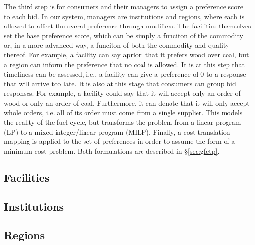 The third step is for consumers and their managers to assign a preference score
to each bid. In our system, managers are institutions and regions, where each is
allowed to affect the overal preference through modifiers. The facilities
themselves set the base preference score, which can be simply a funciton of the
commodity or, in a more advanced way, a funciton of both the commodity and
quality thereof. For example, a facility can say apriori that it prefers wood
over coal, but a region can inform the preference that no coal is allowed. It is
at this step that timeliness can be assessed, i.e., a facility can give a
preference of 0 to a response that will arrive too late. It is also at this
stage that consumers can group bid responses. For example, a facility could say
that it will accept only an order of wood or only an order of coal. Furthermore,
it can denote that it will only accept whole orders, i.e. all of its order must
come from a single supplier. This models the reality of the fuel cycle, but
transforms the problem from a linear program (LP) to a mixed integer/linear
program (MILP). Finally, a cost translation mapping is applied to the set of
preferences in order to assume the form of a minimum cost problem. Both
formulations are described in \S\ref{sec:gfctp}.

\subsection{Facilities}

\subsection{Institutions}

\subsection{Regions}
